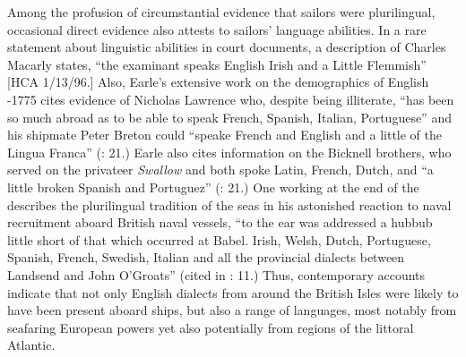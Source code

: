 Among the profusion of circumstantial evidence that sailors were plurilingual, occasional direct evidence also attests to sailors’ language abilities. In a rare statement about linguistic abilities in court documents, a description of Charles Macarly states, “the examinant speaks English Irish and a Little Flemmish” [HCA 1/13/96.] Also, Earle’s extensive work on the demographics of English \citealt{Sailors1570}-1775 cites evidence of Nicholas Lawrence who, despite being illiterate, “has been so much abroad as to be able to speak French, Spanish, Italian, Portuguese” and his shipmate Peter Breton could “speake French and English and a little of the Lingua Franca” (\citeyear*{Breton1998}: 21.) Earle also cites information on the Bicknell brothers, who served on the privateer \textit{Swallow} and both spoke Latin, French, Dutch, and “a little broken Spanish and Portuguez” (\citeyear*{Breton1998}: 21.) One  working at the end of the  describes the plurilingual tradition of the seas in his astonished reaction to naval recruitment aboard British naval vessels, “to the ear was addressed a hubbub little short of that which occurred at Babel. Irish, Welsh, Dutch, Portuguese, Spanish, French, Swedish, Italian and all the provincial dialects between Landsend and John O’Groats” (cited in \citealt{AdkinsAdkins2008}: 11.) Thus, contemporary accounts indicate that not only English dialects from around the British Isles were likely to have been present aboard ships, but also a range of languages, most notably from seafaring European powers yet also potentially from regions of the littoral Atlantic. 

